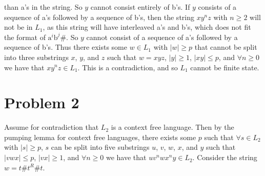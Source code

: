 \documentclass[12pt]{article}
\begin{document}
than a's in the string. So \(y\) cannot consist entirely of b's. If \(y\) consists of a sequence of a's followed by a sequence of b's, then the string \(xy^nz\)
with \(n\geq 2\) will not be in \(L_1\), as this string will have interleaved a's and b's, which does not fit the format of \(\text{a}^i\text{b}^j\text{\#}\).
So \(y\) cannot consist of a sequence of a's followed by a sequence of b's. Thus there exists some \(w \in L_1\) with \(|w|\geq p\) that cannot be split into
three substrings \(x\), \(y\), and \(z\) such that \(w=xyz\), \(|y|\geq 1\), \(|xy|\leq p\), and \(\forall n\geq 0\) we have that \(xy^nz\in L_1\). This is a
contradiction, and so \(L_1\) cannot be finite state.

\section*{Problem 2}

Assume for contradiction that \(L_2\) is a context free language. Then by the pumping lemma for context free languages, there exists some
\(p\) such that \(\forall s\in L_2\) with \(|s|\geq p\), \(s\) can be split into five substrings \(u\), \(v\), \(w\), \(x\), and \(y\) such that
\(|vwx|\leq p\), \(|vx|\geq 1\), and \(\forall n\geq 0\) we have that \(uv^nwx^ny\in L_2\). Consider the string \(w=t\#t^R\#t\).
\end{document}
